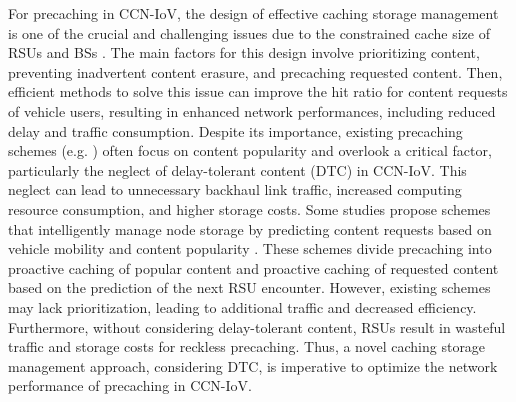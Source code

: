 \documentclass[journal]{IEEEtran}
\begin{document}
For precaching in CCN-IoV, the design of effective caching storage management is one of the crucial and challenging issues due to the constrained cache size of RSUs and BSs \cite{Wang2021, Lin2021, Yao2018}.
The main factors for this design involve prioritizing content, preventing inadvertent content erasure, and precaching requested content.
Then, efficient methods to solve this issue can improve the hit ratio for content requests of vehicle users, resulting in enhanced network performances, including reduced delay and traffic consumption.
Despite its importance, existing precaching schemes (e.g. \cite{Wang2021, Feng2023}) often focus on content popularity and overlook a critical factor, particularly the neglect of delay-tolerant content (DTC) in CCN-IoV.
This neglect can lead to unnecessary backhaul link traffic, increased computing resource consumption, and higher storage costs.
Some studies propose schemes that intelligently manage node storage by predicting content requests based on vehicle mobility and content popularity \cite{Zhe2020, Liu2018}.
These schemes divide precaching into proactive caching of popular content and proactive caching of requested content based on the prediction of the next RSU encounter.
However, existing schemes may lack prioritization, leading to additional traffic and decreased efficiency.
Furthermore, without considering delay-tolerant content, RSUs result in wasteful traffic and storage costs for reckless precaching.
Thus, a novel caching storage management approach, considering DTC, is imperative to optimize the network performance of precaching in CCN-IoV.
\end{document}
